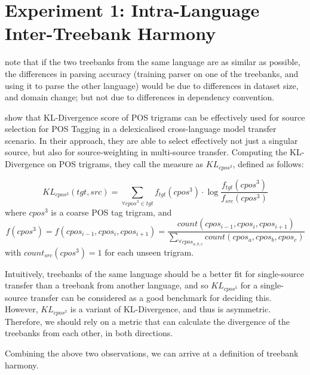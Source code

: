 \chapter{Experiment 1: Intra-Language Inter-Treebank Harmony}
\label{chap:harmony}

\cite{alonso2016universal} note that if the two treebanks from the same language are as similar as possible, the differences in parsing accuracy (training parser on one of the treebanks, and using it to parse the other language) would be due to differences in dataset size, and domain change; but not due to differences in dependency convention.

\cite{klcpos3} show that KL-Divergence score of POS trigrams can be effectively used for source selection for POS Tagging in a delexicalised cross-language model transfer scenario. In their approach, they are able to select effectively not just a singular source, but also for source-weighting in multi-source transfer. Computing the KL-Divergence on POS trigrams, they call the measure as \(KL_{cpos^3}\), defined as follows:

\theoremstyle{definition}
\begin{definition}
\label{def:klcpos3}
\begin{equation}
\label{eqn:klcpos3}
    KL_{cpos^3}(tgt, src) = \sum_{\forall cpos^3 \in tgt}^{}f_{tgt}(cpos^3)\cdot\log\dfrac{f_{tgt}(cpos^3)}{f_{src}(cpos^3)}
\end{equation}
where \(cpos^3\) is a coarse POS tag trigram, and \\
\begin{equation}
\label{eqn:cpos}
    f(cpos^3) = f(cpos_{i-1}, cpos_{i}, cpos_{i+1}) = \frac{count(cpos_{i-1}, cpos_{i}, cpos_{i+1})}{\sum_{\forall cpos_{a,b,c}}{count(cpos_{a}, cpos_{b}, cpos_{c})}}
\end{equation}
with \(count_{src}(cpos^3) = 1\) for each unseen trigram.
\end{definition}

Intuitively, treebanks of the same language should be a better fit for single-source transfer than a treebank from another language, and so \(KL_{cpos^3}\) for a single-source transfer can be considered as a good benchmark for deciding this. However, \(KL_{cpos^3}\) is a variant of KL-Divergence, and thus is asymmetric. Therefore, we should rely on a metric that can calculate the divergence of the treebanks from each other, in both directions.

Combining the above two observations, we can arrive at a definition of treebank harmony.

